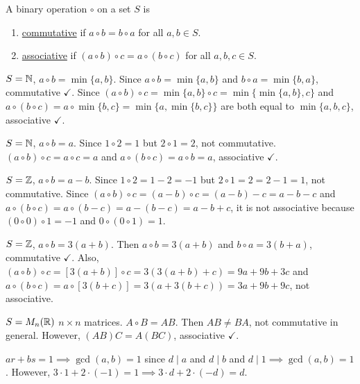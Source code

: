 \documentclass[]{article}
\begin{document}
\begin{definition}
	A binary operation $\circ$ on a set $S$ is
	\begin{enumerate}
		\item \ul{commutative} if $a\circ b = b\circ a$ for all $a,b\in S$.
		\item \ul{associative} if $(a\circ b)\circ c = a\circ(b\circ c)$ for all $a,b,c\in S$.
	\end{enumerate}
\end{definition}
\begin{example}
	$S = \mathbb{N}$, $a\circ b = \min\{a,b\}$. Since $a\circ b = \min\{a,b\}$ and $b\circ a = \min\{b,a\}$, commutative $\checkmark$.
	Since $(a\circ b)\circ c = \min\{a,b\}\circ c = \min\{\min\{a,b\},c\}$ and $a\circ(b\circ c) = a\circ\min\{b,c\} = \min\{a,\min\{b,c\}\}$ are both equal to $\min\{a,b,c\}$, associative $\checkmark$.
\end{example}
\begin{example}
	$S = \mathbb{N}$, $a\circ b = a$. Since $1\circ 2 = 1$ but $2\circ 1 = 2$, not commutative.
	$(a\circ b)\circ c = a\circ c = a$ and $a\circ(b\circ c) = a\circ b = a$, associative $\checkmark$.
\end{example}
\begin{example}
	$S = \mathbb{Z}$, $a\circ b = a-b$. Since $1\circ 2 = 1-2 = -1$ but $2\circ 1 = 2 = 2-1 = 1$, not commutative.
	Since $(a\circ b)\circ c = (a-b)\circ c = (a-b)-c = a-b-c$ and $a\circ(b\circ c) = a\circ(b-c) = a-(b-c) = a-b+c$, it is not associative because $(0\circ 0)\circ 1 = -1$ and $0\circ(0\circ 1) = 1$.
\end{example}
\begin{example}
	$S = \mathbb{Z}$, $a\circ b = 3(a+b)$. Then $a\circ b = 3(a+b)$ and $b\circ a = 3(b+a)$, commutative $\checkmark$.
	Also, $(a\circ b)\circ c = [3(a+b)]\circ c = 3(3(a+b)+c) = 9a+9b + 3c$ and $a\circ(b\circ c) = a\circ[3(b+c)] = 3(a+3(b+c)) = 3a+9b+9c$, not associative.
\end{example}
\begin{example}
	$S = M_n(\mathbb{R})$ $n\times n$ matrices. $A\circ B = AB$. Then $AB\neq BA$, not commutative in general. However, $(AB)C = A(BC)$, associative $\checkmark$.
\end{example}

\begin{example}
	[HW Review] $ar+bs = 1 \implies \gcd(a,b) = 1$ since $d\mid a$ and $d\mid b$ and $d\mid 1 \implies \gcd(a,b) = 1$. However, $3\cdot 1 + 2\cdot(-1) = 1 \implies 3\cdot d + 2\cdot(-d) = d$.
\end{example}
\end{document}
